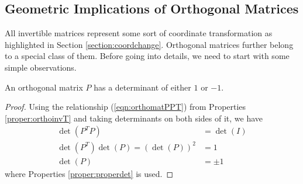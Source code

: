 \subsection{Geometric Implications of Orthogonal Matrices}
\label{section:orthogeometricsub}
All invertible matrices represent some sort of coordinate transformation as highlighted in Section \ref{section:coordchange}. Orthogonal matrices further belong to a special class of them. Before going into details, we need to start with some simple observations.
\begin{proper}
\label{proper:orthopm1det}
An orthogonal matrix $P$ has a determinant of either $1$ or $-1$.
\end{proper}
\begin{proof}
Using the relationship (\ref{eqn:orthomatPPT}) from Properties \ref{proper:orthoinvT} and taking determinants on both sides of it, we have
\begin{align*}
\det(P^TP) &= \det(I) \\
\det(P^T)\det(P) = (\det(P))^2 &= 1\\
\det(P) &= \pm 1
\end{align*}
where Properties \ref{proper:properdet} is used.    
\end{proof} 
